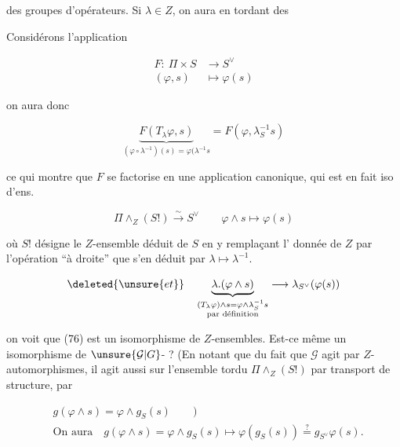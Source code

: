 des groupes d'opérateurs.  Si $\lambda\in Z$, on aura en tordant  des  


Considérons l'application

\[
\begin{aligned}
F:\ \Pi\times S&\longrightarrow S^\vee\\
(\varphi,s)&\longmapsto\varphi(s)
\end{aligned}
\]

on aura donc

\[
\underbrace{F(T_\lambda\varphi,s)}_{(\varphi\circ\lambda^{-1})(s)=\varphi(\lambda^{-1}s}
=F(\varphi,\lambda_S^{-1}s)
\]

ce qui montre que $F$ se factorise en une application canonique, qui est en fait iso d'ens.

\[
\Pi\wedge_Z(S!)\xrightarrow{\sim} S^\vee\qquad\varphi\wedge s\longmapsto\varphi(s) \tag*{(76)}
\]

où $S!$ désigne le $Z$-ensemble déduit de $S$ en y remplaçant l'   donnée  de $Z$ par l'opération ``à droite'' que s'en déduit par $\lambda\longmapsto\lambda^{-1}$.

 

\[
\deleted{\unsure{et}}\quad
\underbrace{\lambda.(\varphi\wedge s)}_{\substack{(T_\lambda\varphi)\wedge s=\varphi\wedge\lambda_S^{-1}s\\\text{par définition}}}
\longrightarrow\lambda_{S^\vee}(\varphi(s))
\]

on voit que (76) est un isomorphisme de $Z$-ensembles.  Est-ce même un isomorphisme de $\unsure{\mathcal G|G}$-  ? (En notant que du fait que $\mathcal G$ agit   par $Z$-automorphismes, il agit aussi sur l'ensemble tordu $\Pi\wedge_Z(S!)$ par transport de structure, par

\[
\begin{aligned}
&g(\varphi\wedge s)=\varphi\wedge g_S(s)\qquad)\\
&\text{On aura}\quad g(\varphi\wedge s)=\varphi\wedge g_S(s)\longmapsto
\varphi(g_S(s))\overset?=g_{S^\vee}\varphi(s).
\end{aligned} \tag*{(77)}
\]

